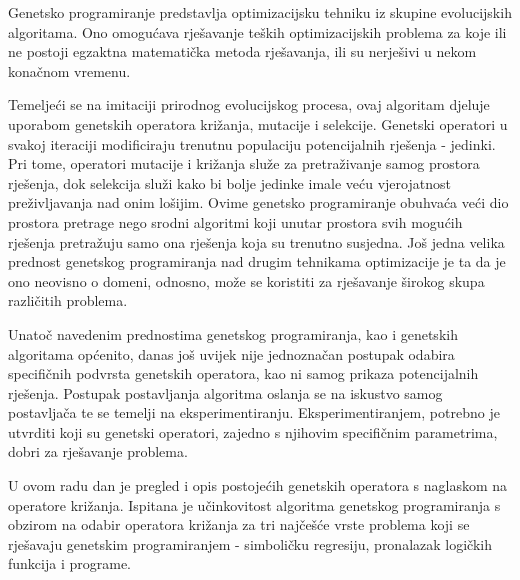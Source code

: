 Genetsko programiranje predstavlja optimizacijsku tehniku iz skupine evolucijskih algoritama. Ono omogućava rješavanje teških optimizacijskih problema za koje ili ne postoji egzaktna matematička metoda rješavanja, ili su nerješivi u nekom konačnom vremenu. 

Temeljeći se na imitaciji prirodnog evolucijskog procesa, ovaj algoritam djeluje uporabom genetskih operatora križanja, mutacije i selekcije. Genetski operatori u svakoj iteraciji modificiraju trenutnu populaciju potencijalnih rješenja - jedinki. Pri tome, operatori mutacije i križanja služe za pretraživanje samog prostora rješenja, dok selekcija služi kako bi bolje jedinke imale veću vjerojatnost preživljavanja nad onim lošijim. Ovime genetsko programiranje obuhvaća veći dio prostora pretrage nego srodni algoritmi koji unutar prostora svih mogućih rješenja pretražuju samo ona rješenja koja su trenutno susjedna. Još jedna velika prednost genetskog programiranja nad drugim tehnikama optimizacije je ta da je ono neovisno o domeni, odnosno, može se koristiti za rješavanje širokog skupa različitih problema.

Unatoč navedenim prednostima genetskog programiranja, kao i genetskih algoritama općenito, danas još uvijek nije jednoznačan postupak odabira specifičnih podvrsta genetskih operatora, kao ni samog prikaza potencijalnih rješenja. Postupak postavljanja algoritma oslanja se na iskustvo samog postavljača te se temelji na eksperimentiranju. Eksperimentiranjem, potrebno je utvrditi koji su genetski operatori, zajedno s njihovim specifičnim parametrima, dobri za rješavanje problema.

U ovom radu dan je pregled i opis postojećih genetskih operatora s naglaskom na operatore križanja. Ispitana je učinkovitost algoritma genetskog programiranja s obzirom na odabir operatora križanja za tri najčešće vrste problema koji se rješavaju genetskim programiranjem - simboličku regresiju, pronalazak logičkih funkcija i programe.